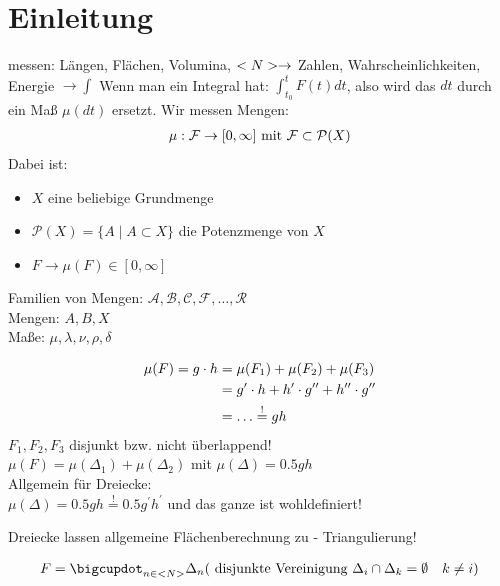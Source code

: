 \chapter{Einleitung}

messen: Längen, Flächen, Volumina, $<N> \to $ Zahlen, Wahrscheinlichkeiten, Energie $\to \int$
Wenn man ein Integral hat: $\int_{t_0}^{t}F(t)dt$, also wird das $dt$ durch ein Maß $\mu(dt)$ ersetzt.
\newline Wir messen Mengen:
\begin{align}
	\mu: \mathcal{F} \to [0,\infty] \text{ mit }\mathcal{F} \subset \mathcal{P}(X) \notag
\end{align}
Dabei ist:
\begin{itemize}
	\item $X$ eine beliebige Grundmenge
	\item $\mathcal{P}(X)=\{A\mid A\subset X\}$ die Potenzmenge von $X$
	\item $F \to \mu(F) \in [0,\infty]$
\end{itemize}
Familien von Mengen: $\mathcal{A}, \mathcal{B}, \mathcal{C}, \mathcal{F}, \dots, \mathcal{R}$\\
Mengen: $A, B, X$\\
Maße: $\mu, \lambda, \nu, \rho, \delta$
\begin{example}[Flächenmessung]
	\begin{align}
		\mu(F) = g \cdot h &= \mu(F_1) + \mu(F_2) + \mu(F_3)\notag\\
		                   &= g^{\prime} \cdot h + h^{\prime}\cdot g^{\prime \prime} + h^{\prime \prime} \cdot g^{\prime \prime}\notag\\
		                   &= \dots \overset{!}{=} gh\notag
	\end{align}
	$F_1, F_2, F_3$ disjunkt bzw. nicht überlappend!\\
	$\mu(F) = \mu(\Delta_1)+\mu(\Delta_2)$ mit $\mu(\Delta) = 0.5 gh$\\ %
	Allgemein für Dreiecke: \\%
	$\mu(\Delta) = 0.5 gh \overset{!}{=} 0.5 g^{\prime}h^{\prime}$ und das ganze ist wohldefiniert!
\end{example}
Dreiecke lassen allgemeine Flächenberechnung zu - Triangulierung!

\begin{align}
	F = \bigcupdot_{n\in \natur} \Delta_n (\text{ disjunkte Vereinigung } \Delta_i \cap \Delta_k = \emptyset \quad k \neq i)\notag
\end{align} %



